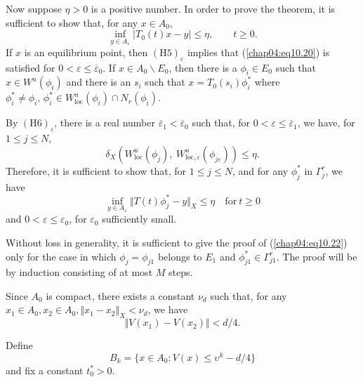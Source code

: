 \documentclass{surv-l}
\theoremstyle{plain}
\theoremstyle{definition}
\numberwithin{equation}{section}
\numberwithin{figure}{chapter}
\begin{document}
Now suppose $\eta>0$ is a positive number. In order to prove the theorem, it is sufficient to show that, for any $x\in A_{0}$,
\begin{equation}\label{chap04:eq10.20}
\inf_{y\in A_{\varepsilon}}|T_{0}(t)x-y|\leq\eta,\qquad t\geq 0.
\end{equation}
If $x$ is an equilibrium point, then $\mathrm{(H5)}_{\varepsilon}$ implies that (\ref{chap04:eq10.20}) is satisfied for $0< \varepsilon\leq\overline{\varepsilon}_{0}$. If $x\in A_{0}\backslash E_{0}$, then there is a $\phi_{i}\in E_{0}$ such that $x\in W^{u}(\phi_{i})$ and there is an $s_{i}$ such that $x=T_{0}(s_{i})\phi_{i}^{\ast}$ where $\phi_{i}^{\ast}\neq\phi_{i},\,\phi_{i}^{\ast}\in W_{\mathrm{loc}}^{u}(\phi_{i})\cap N_{r}(\phi_{i})$.

By $\mathrm{(H6)}_{\varepsilon}$, there is a real number $\overline{\varepsilon}_{1}<\overline{\varepsilon}_{0}$ such that, for $0<\varepsilon\leq\overline{\varepsilon}_{1}$, we have, for $1\leq j\leq N$,
\begin{equation}\label{chap04:eq10.21}
\delta_{X}(W_{\mathrm{loc}}^{u}(\phi_{j}),\ W_{\mathrm{loc},\varepsilon}^{u}(\phi_{j\varepsilon}))\leq\eta.
\end{equation}
Therefore, it is sufficient to show that, for $1\leq j\leq N$, and for any $\phi_{j}^{\ast}$ in $\Gamma_{j}^{r}$, we have
\begin{equation}\label{chap04:eq10.22}
\inf_{y\in A_{\varepsilon}}\Vert T(t)\phi_{j}^{\ast}-y\Vert_{X}\leq\eta\quad \mathrm{for}\ t\geq 0
\end{equation}
and $ 0<\varepsilon \leq\varepsilon_{0}$, for $\varepsilon_{0}$ sufficiently small.

Without loss in generality, it is sufficient to give the proof of (\ref{chap04:eq10.22}) only for the case in which $\phi_{j}=\phi_{j1}$ belongs to $E_{1}$ and $\phi_{j1}^{\ast}\in\Gamma_{j1}^{r}$. The proof will be by induction consisting of at most $M$ steps.

Since $A_{0}$ is compact, there exists a constant $\nu_{d}$ such that, for any $x_{1}\in A_{0},x_{2}\in A_{0},\Vert x_{1}-x_{2}\Vert_{X}<\nu_{d}$, we have
\begin{equation}\label{chap04:eq10.23}
\Vert V(x_{1})-V(x_{2})\Vert<d/4.
\end{equation}

Define
\begin{equation*}
B_{k}=\{x\in A_{0}:V(x)\leq \upsilon^{k}-d/4\}
\end{equation*}
and fix a constant $t_{0}^{\ast}>0$.
\end{document}
